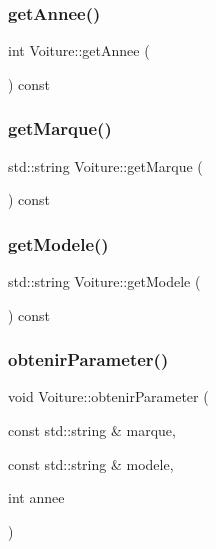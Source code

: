 \subsubsection{\texorpdfstring{get\+Annee()}{getAnnee()}}
{\footnotesize\ttfamily int Voiture\+::get\+Annee (\begin{DoxyParamCaption}{ }\end{DoxyParamCaption}) const}

\mbox{\label{classVoiture_a59480eb63351dd4751176b7a71aa12ae}} 
\subsubsection{\texorpdfstring{get\+Marque()}{getMarque()}}
{\footnotesize\ttfamily std\+::string Voiture\+::get\+Marque (\begin{DoxyParamCaption}{ }\end{DoxyParamCaption}) const}

\mbox{\label{classVoiture_a4ac24e5018ddea75c7d2484d42f08a13}} 
\subsubsection{\texorpdfstring{get\+Modele()}{getModele()}}
{\footnotesize\ttfamily std\+::string Voiture\+::get\+Modele (\begin{DoxyParamCaption}{ }\end{DoxyParamCaption}) const}

\mbox{\label{classVoiture_a3a0a10aad90441b4eff420080acf250f}} 
\subsubsection{\texorpdfstring{obtenir\+Parameter()}{obtenirParameter()}}
{\footnotesize\ttfamily void Voiture\+::obtenir\+Parameter (\begin{DoxyParamCaption}\item[{const std\+::string \&}]{marque,  }\item[{const std\+::string \&}]{modele,  }\item[{int}]{annee }\end{DoxyParamCaption})}

